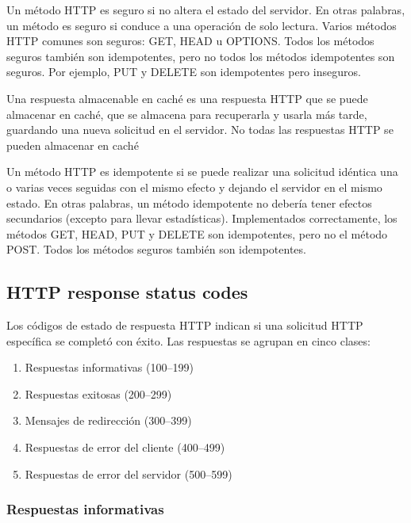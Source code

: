 \begin{remark}
Un método HTTP es seguro si no altera el estado del servidor. En otras palabras, un método es seguro si conduce a una operación de solo lectura. Varios métodos HTTP comunes son seguros: GET, HEAD u OPTIONS. Todos los métodos seguros también son idempotentes, pero no todos los métodos idempotentes son seguros. Por ejemplo, PUT y DELETE son idempotentes pero inseguros.
\end{remark}

\begin{remark}
Una respuesta almacenable en caché es una respuesta HTTP que se puede almacenar en caché, que se almacena para recuperarla y usarla más tarde, guardando una nueva solicitud en el servidor. No todas las respuestas HTTP se pueden almacenar en caché
\end{remark}

\begin{remark}
Un método HTTP es idempotente si se puede realizar una solicitud idéntica una o varias veces seguidas con el mismo efecto y dejando el servidor en el mismo estado. En otras palabras, un método idempotente no debería tener efectos secundarios (excepto para llevar estadísticas). Implementados correctamente, los métodos GET, HEAD, PUT y DELETE son idempotentes, pero no el método POST. Todos los métodos seguros también son idempotentes.
\end{remark}

\subsection{HTTP response status codes}

Los códigos de estado de respuesta HTTP indican si una solicitud HTTP específica se completó con éxito. Las respuestas se agrupan en cinco clases:

\begin{enumerate}
	\item Respuestas informativas (100–199)
	\item Respuestas exitosas (200–299)
	\item Mensajes de redirección (300–399)
	\item Respuestas de error del cliente (400–499)
	\item Respuestas de error del servidor (500–599)
\end{enumerate}

\subsubsection{Respuestas informativas}


